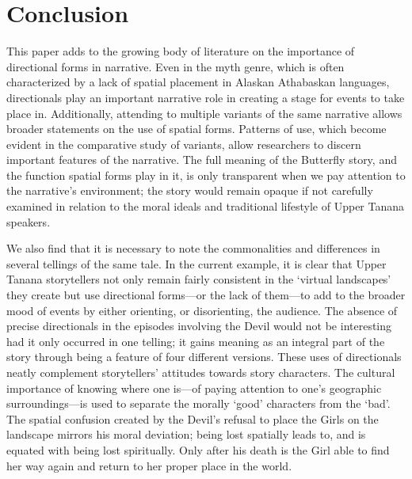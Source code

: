 \section{Conclusion}
\label{section:conclusion}

This paper adds to the growing body of literature on the importance of directional forms in narrative. Even in the myth genre, which is often characterized by a lack of spatial placement in Alaskan Athabaskan languages, directionals play an important narrative role in creating a stage for events to take place in. Additionally, attending to multiple variants of the same narrative allows broader statements on the use of spatial forms. Patterns of use, which become evident in the comparative study of variants, allow researchers to discern important features of the narrative. The full meaning of the Butterfly story, and the function spatial forms play in it, is only transparent when we pay attention to the narrative's environment; the story would remain opaque if not carefully examined in relation to the moral ideals and traditional lifestyle of Upper Tanana speakers.

We also find that it is necessary to note the commonalities and differences in several tellings of the same tale. In the current example, it is clear that Upper Tanana storytellers not only remain fairly consistent in the `virtual landscapes' they create but use directional forms—or the lack of them—to add to the broader mood of events by either orienting, or disorienting, the audience. The absence of precise directionals in the episodes involving the Devil would not be interesting had it only occurred in one telling; it gains meaning as an integral part of the story through being a feature of four different versions. These uses of directionals neatly complement storytellers' attitudes towards story characters. The cultural importance of knowing where one is—of paying attention to one's geographic surroundings—is used to separate the morally `good' characters from the `bad'. The spatial confusion created by the Devil's refusal to place the Girls on the landscape mirrors his moral deviation; being lost spatially leads to, and is equated with being lost spiritually. Only after his death is the Girl able to find her way again and return to her proper place in the world.







\label{brucks-ch-end}

\let\eachwordone\rm
